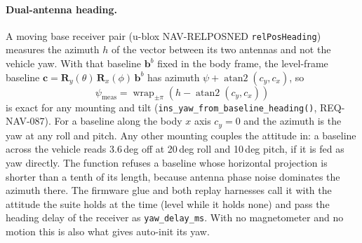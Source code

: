 \documentclass[11pt,a4paper]{article}
\newcommand{\vect}[1]{\bm{#1}}
\newcommand{\mat}[1]{\bm{#1}}
\newcommand{\code}[1]{\texttt{#1}}
\begin{document}
\paragraph{Dual-antenna heading.} A moving base receiver pair (u-blox
NAV-RELPOSNED \code{relPosHeading}) measures the azimuth $h$ of the vector
between its two antennas and not the vehicle yaw. With that baseline
$\vect{b}^b$ fixed in the body frame, the level-frame baseline
$\vect{c} = \mat{R}_y(\theta)\,\mat{R}_x(\phi)\,\vect{b}^b$ has azimuth
$\psi + \operatorname{atan2}(c_y, c_x)$, so
\begin{equation}
  \psi_{\text{meas}} = \operatorname{wrap}_{\pm\pi}\!\left(
    h - \operatorname{atan2}(c_y, c_x)\right)
\end{equation}
is exact for any mounting and tilt
(\code{ins\_\allowbreak{}yaw\_\allowbreak{}from\_\allowbreak{}baseline\_\allowbreak{}heading()},
REQ-NAV-087). For a baseline along the body $x$ axis $c_y = 0$ and the
azimuth is the yaw at any roll and pitch. Any other mounting couples the
attitude in: a baseline across the vehicle reads 3.6\,deg off at 20\,deg
roll and 10\,deg pitch, if it is fed as yaw directly. The function refuses a
baseline whose horizontal projection is shorter than a tenth of its
length, because antenna phase noise dominates the azimuth there. The firmware
glue and both replay harnesses call it with the attitude the suite holds
at the time (level while it holds none) and pass the heading delay of the
receiver as \code{yaw\_\allowbreak{}delay\_\allowbreak{}ms}. With no
magnetometer and no motion this is also what gives auto-init its yaw.
\end{document}
